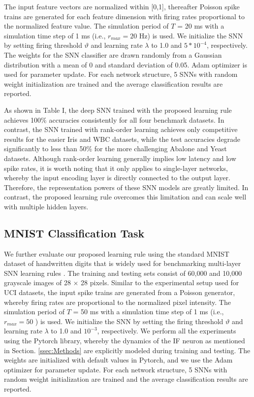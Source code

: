 \documentclass[conference]{IEEEtran}
\begin{document}
The input feature vectors are normalized within [0,1], thereafter Poisson spike trains are generated for each feature dimension with firing rates proportional to the normalized feature value. The simulation period of $T$ = 20 ms with a simulation time step of 1 ms (i.e., $r_{max} = 20$  Hz) is used. We initialize the SNN by setting firing threshold $\vartheta$ and learning rate $\lambda$ to 1.0 and $5*10^{-4}$, respectively. The weights for the SNN classifier are drawn randomly from a Gaussian distribution with a mean of 0 and standard deviation of 0.05. Adam optimizer\cite{kingma2014adam} is used for parameter update. For each network structure, 5 SNNs with random weight initialization are trained and the average classification results are reported.

As shown in Table I, the deep SNN trained with the proposed learning rule achieves 100\% accuracies consistently for all four benchmark datasets. In contrast, the SNN trained with rank-order learning \cite{wang2017spiketemp} achieves only competitive results for the easier Iris and WBC datasets, while the test accuracies degrade significantly to less than 50\% for the more challenging Abalone and Yeast datasets. Although rank-order learning generally implies low latency and low spike rates, it is worth noting that it only applies to single-layer networks, whereby the input encoding layer is directly connected to the output layer. Therefore, the representation powers of these SNN models are greatly limited. In contrast, the proposed learning rule overcomes this limitation and can scale well with multiple hidden layers.

\subsection{MNIST Classification Task}
We further evaluate our proposed learning rule using the standard MNIST dataset of handwritten digits that is widely used for benchmarking multi-layer SNN learning rules \cite{tavanaei2018deep}. The training and testing sets consist of 60,000 and 10,000 grayscale images of 28 $\times$ 28 pixels. Similar to the experimental setup used for UCI datasets, the input spike trains are generated from a Poisson generator, whereby firing rates are proportional to the normalized pixel intensity. The simulation period of $T$ = 50 ms with a simulation time step of 1 ms (i.e., $r_{max} = 50$ ) is used. We initialize the SNN by setting the firing threshold $\vartheta$ and learning rate $\lambda$ to 1.0 and $10^{-3}$, respectively. We perform all the experiments using the Pytorch library, whereby the dynamics of the IF neuron as mentioned in Section. \ref{ssec:Methods} are explicitly modeled during training and testing. The weights are initialized with default values in Pytorch, and we use the Adam optimizer for parameter update. For each network structure, 5 SNNs with random weight initialization are trained and the average classification results are reported.
\end{document}
